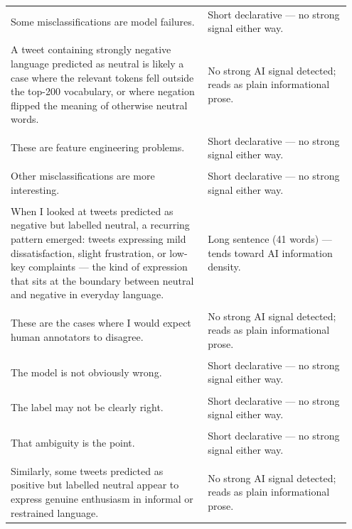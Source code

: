 \documentclass[11pt]{article}
\begin{document}
\begin{longtable}{|p{0.55\linewidth}|p{0.40\linewidth}|}
\hline
\rule{0pt}{3.5cm} & \\
\hline
Some misclassifications are model failures. & Short declarative --- no strong signal either way. \\[2pt]
\hline
\rule{0pt}{3.5cm} & \\
\hline
A tweet containing strongly negative language predicted as neutral is likely a case where the relevant tokens fell outside the top-200 vocabulary, or where negation flipped the meaning of otherwise neutral words. & No strong AI signal detected; reads as plain informational prose. \\[2pt]
\hline
\rule{0pt}{3.5cm} & \\
\hline
These are feature engineering problems. & Short declarative --- no strong signal either way. \\[2pt]
\hline
\rule{0pt}{3.5cm} & \\
\hline
Other misclassifications are more interesting. & Short declarative --- no strong signal either way. \\[2pt]
\hline
\rule{0pt}{3.5cm} & \\
\hline
When I looked at tweets predicted as negative but labelled neutral, a recurring pattern emerged: tweets expressing mild dissatisfaction, slight frustration, or low-key complaints --- the kind of expression that sits at the boundary between neutral and negative in everyday language. & Long sentence (41 words) --- tends toward AI information density. \\[2pt]
\hline
\rule{0pt}{3.5cm} & \\
\hline
These are the cases where I would expect human annotators to disagree. & No strong AI signal detected; reads as plain informational prose. \\[2pt]
\hline
\rule{0pt}{3.5cm} & \\
\hline
The model is not obviously wrong. & Short declarative --- no strong signal either way. \\[2pt]
\hline
\rule{0pt}{3.5cm} & \\
\hline
The label may not be clearly right. & Short declarative --- no strong signal either way. \\[2pt]
\hline
\rule{0pt}{3.5cm} & \\
\hline
That ambiguity is the point. & Short declarative --- no strong signal either way. \\[2pt]
\hline
\rule{0pt}{3.5cm} & \\
\hline
Similarly, some tweets predicted as positive but labelled neutral appear to express genuine enthusiasm in informal or restrained language. & No strong AI signal detected; reads as plain informational prose. \\[2pt]

\end{longtable}
\end{document}
